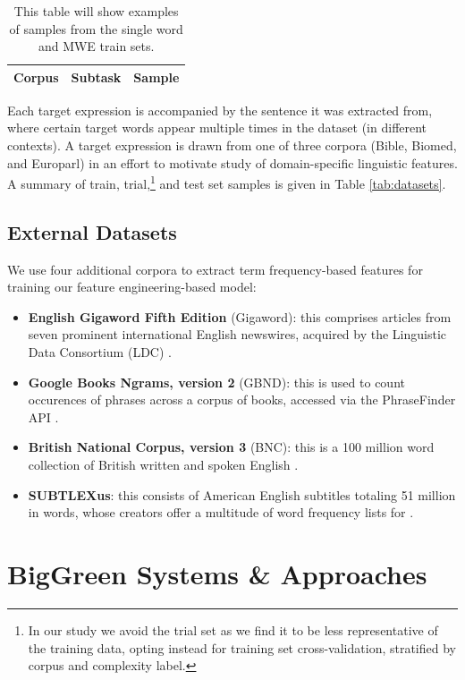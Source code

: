 \documentclass[11pt,a4paper]{article}
\begin{document}
\begin{table}
  \centering
  \begin{tabular}{l|l|l}
    \toprule
    Corpus & Subtask & Sample \\
    \bottomrule
  \end{tabular}
  \caption{\label{tab:samples} This table will show examples of samples from the single word and MWE train sets.}
\end{table}

Each target expression is accompanied by the sentence it was extracted from, where certain target words appear multiple times in the dataset (in different contexts). A target expression is drawn from one of three corpora (Bible, Biomed, and Europarl) in an effort to motivate study of domain-specific linguistic features. A summary of train, trial,\footnote{In our study we avoid the trial set as we find it to be less representative of the training data, opting instead for training set cross-validation, stratified by corpus and complexity label.} and test set samples is given in Table \ref{tab:datasets}.

\subsection{External Datasets}

We use four additional corpora to extract term frequency-based features for training our feature engineering-based model:

\begin{itemize}
  \item \textbf{English Gigaword Fifth Edition} (Gigaword): this comprises articles from seven prominent international English newswires, acquired by the Linguistic Data Consortium (LDC) \citep{gigaword}.
  \item \textbf{Google Books Ngrams, version 2} (GBND): this is used to count occurences of phrases across a corpus of books, accessed via the PhraseFinder API \citep{phrasefinder}.
  \item \textbf{British National Corpus, version 3} (BNC): this is a 100 million word collection of British written and spoken English \citep{BNC}.
  \item \textbf{SUBTLEXus}: this consists of American English subtitles totaling 51 million in words, whose creators offer a multitude of word frequency lists for \citep{Brysbaert2009MovingBK}.
\end{itemize}

\section{BigGreen Systems \& Approaches}
\end{document}
